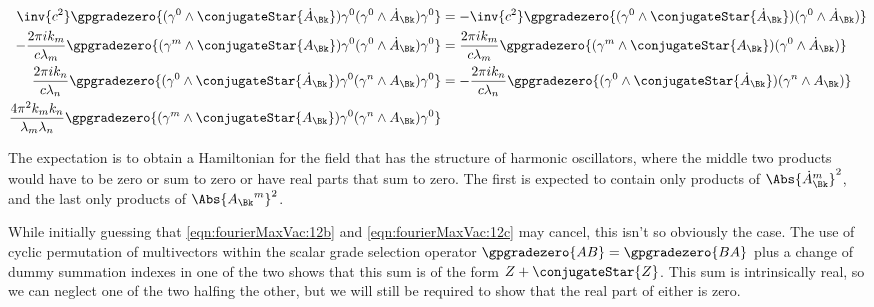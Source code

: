 \begin{subequations}
\label{eqn:fourierMaxVac:12}
\begin{align}
\inv{c^2}
\gpgradezero{ (\gamma^0 \wedge \conjugateStar{\dot{A}_{\Bk}} ) \gamma^0 (\gamma^0 \wedge \dot{A}_\Bk) \gamma^0 } &=
-\inv{c^2}
\gpgradezero{ (\gamma^0 \wedge \conjugateStar{\dot{A}_{\Bk}} ) (\gamma^0 \wedge \dot{A}_\Bk) } 
\label{eqn:fourierMaxVac:12a}
\\
- \frac{2 \pi i k_m}{c \lambda_m} 
\gpgradezero{ 
(\gamma^m \wedge \conjugateStar{A_{\Bk}} ) \gamma^0 ( \gamma^0 \wedge \dot{A}_\Bk ) \gamma^0
} 
&=
\frac{2 \pi i k_m}{c \lambda_m} 
\gpgradezero{ 
(\gamma^m \wedge \conjugateStar{A_{\Bk}} ) ( \gamma^0 \wedge \dot{A}_\Bk ) 
} 
\label{eqn:fourierMaxVac:12b}
\\
\frac{2 \pi i k_n}{c \lambda_n} 
\gpgradezero{ 
( \gamma^0 \wedge \conjugateStar{\dot{A}_{\Bk}} ) \gamma^0 ( \gamma^n \wedge A_\Bk ) \gamma^0
} 
&=
-\frac{2 \pi i k_n}{c \lambda_n} 
\gpgradezero{ 
( \gamma^0 \wedge \conjugateStar{\dot{A}_{\Bk}} ) ( \gamma^n \wedge A_\Bk ) 
} 
\label{eqn:fourierMaxVac:12c}
\\
\frac{4 \pi^2 k_m k_n}{\lambda_m \lambda_n}
\gpgradezero{ 
(\gamma^m \wedge \conjugateStar{A_{\Bk}} ) \gamma^0
(\gamma^n \wedge A_\Bk ) \gamma^0
} &
\label{eqn:fourierMaxVac:12d}
\end{align}
\end{subequations}

The expectation is to obtain a Hamiltonian for the field that has the structure of harmonic oscillators, where the middle two products would have to be zero or sum to zero or have real parts that sum to zero.  The first is expected to contain only products of $\Abs{{\dot{A}_\Bk}^m}^2$, and the last only products of $\Abs{{A_\Bk}^m}^2$.

While initially guessing that \ref{eqn:fourierMaxVac:12b} and \ref{eqn:fourierMaxVac:12c} may cancel, this isn't so obviously the case.  The use of cyclic permutation of multivectors within the scalar grade selection operator $\gpgradezero{A B} = \gpgradezero{B A}$ plus a change of dummy summation indexes in one of the two shows that this sum is of the form $Z + \conjugateStar{Z}$.  This sum is intrinsically real, so we can neglect one of the two halfing the other, but we will still be required to show that the real part of either is zero.

\EndArticle

